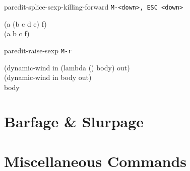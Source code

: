 \documentclass[landscape,a3paper]{article}
\begin{document}
\begin{multicols}{4}
paredit-splice-sexp-killing-forward \texttt{M-<down>, ESC <down>}

\ttfamily
(a (b c\cursor{} d e) f)\\
(a b c\cursor{} f)
\rmfamily

paredit-raise-sexp \texttt{M-r}

\ttfamily
(dynamic-wind in (lambda () \cursor body) out)\\
(dynamic-wind in \cursor body out)\\
\cursor body
\rmfamily

    \section*{Barfage \& Slurpage}

    \section*{Miscellaneous Commands}

  \end{multicols}
\end{document}
